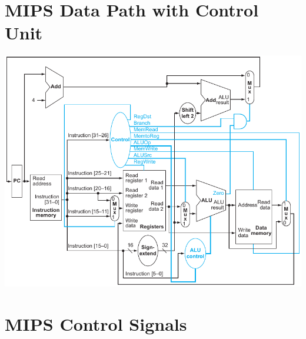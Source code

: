 \documentclass[11pt]{article}
\begin{document}
\begin{minipage}[t]{0.64\linewidth}
	\section*{MIPS Data Path with Control Unit}
	\includegraphics[width=\linewidth]{mips-cpu/fig417.pdf}

	\section*{MIPS Control Signals}
	
\end{minipage}
\end{document}
